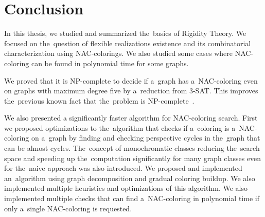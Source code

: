 
\chapter*{Conclusion}



In this thesis,
we studied and summarized the~basics of Rigidity Theory.
We focused on the~question of flexible realizations existence
and its combinatorial characterization using NAC-colorings.
We also studied some cases where NAC-coloring can be found in polynomial time
for some graphs.

We proved that it is NP-complete
to decide if a~graph has a~NAC-coloring even on graphs with maximum degree five
by a~reduction from 3-SAT\@.
This improves the~previous known fact that the~problem is NP-complete~\cite{np_complete}.

We also presented a significantly faster algorithm
for NAC-coloring search.
%
First we proposed optimizations to the~algorithm
that checks if a~coloring is a~NAC-coloring on a~graph
by finding and checking perspective cycles in the~graph
that can be almost cycles.
%
The~concept of monochromatic classes reducing the~search space
and speeding up the~computation significantly for many graph classes
even for the~naive approach was also introduced.
%
We proposed and implemented an~algorithm using graph decomposition and gradual coloring buildup.
We also implemented multiple heuristics and optimizations of this algorithm.
%
We also implemented multiple checks that can find a~NAC-coloring in polynomial time
if only a~single NAC-coloring is requested.


